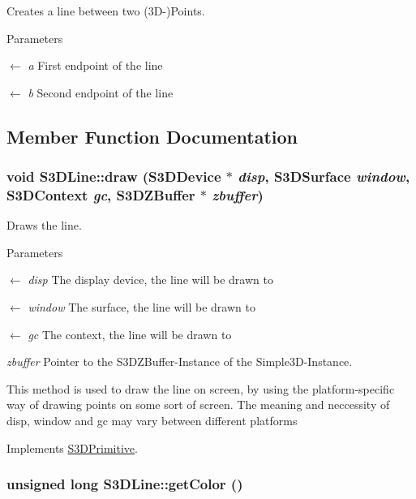Creates a line between two (3D-\/)Points. 


\begin{DoxyParams}{Parameters}
\item[\mbox{$\leftarrow$} {\em a}]First endpoint of the line \item[\mbox{$\leftarrow$} {\em b}]Second endpoint of the line \end{DoxyParams}


\subsection{Member Function Documentation}
\hypertarget{class_s3_d_line_aa7732c2d83fecb5d9934863d0e7875c1}{
\subsubsection[{draw}]{\setlength{\rightskip}{0pt plus 5cm}void S3DLine::draw (S3DDevice $\ast$ {\em disp}, \/  S3DSurface {\em window}, \/  S3DContext {\em gc}, \/  {\bf S3DZBuffer} $\ast$ {\em zbuffer})}}
\label{class_s3_d_line_aa7732c2d83fecb5d9934863d0e7875c1}


Draws the line. 


\begin{DoxyParams}{Parameters}
\item[\mbox{$\leftarrow$} {\em disp}]The display device, the line will be drawn to \item[\mbox{$\leftarrow$} {\em window}]The surface, the line will be drawn to \item[\mbox{$\leftarrow$} {\em gc}]The context, the line will be drawn to \item[{\em zbuffer}]Pointer to the S3DZBuffer-\/Instance of the Simple3D-\/Instance.\end{DoxyParams}
This method is used to draw the line on screen, by using the platform-\/specific way of drawing points on some sort of screen. The meaning and neccessity of disp, window and gc may vary between different platforms 

Implements \hyperlink{class_s3_d_primitive_a857f042bc63ae6233b63b60089e92b81}{S3DPrimitive}.

\hypertarget{class_s3_d_line_a62b49873ae3356cf997ca1fd87a1b7de}{
\subsubsection[{getColor}]{\setlength{\rightskip}{0pt plus 5cm}unsigned long S3DLine::getColor ()}}
\label{class_s3_d_line_a62b49873ae3356cf997ca1fd87a1b7de}


